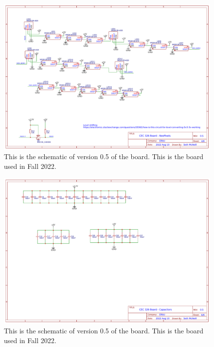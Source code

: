 \begin{landscape}
\begin{figure}[!htb]
	\centering
	\includegraphics[width=\paperwidth]{arduinoStart/Schematic_CEC326v0.5_NeoPixels} %
	\caption{This is the schematic of version 0.5 of the board. This is the board used in Fall 2022.}
	\label{fig:boardSchematic5}
\end{figure} 

\begin{figure}[!htb]
	\centering
	\includegraphics[width=\paperwidth]{arduinoStart/Schematic_CEC326v0.5_Caps} %
	\caption{This is the schematic of version 0.5 of the board. This is the board used in Fall 2022.}
	\label{fig:boardSchematic6}
\end{figure} 

\end{landscape}


